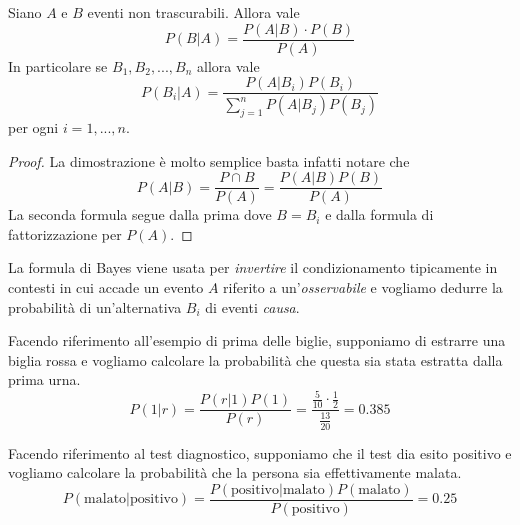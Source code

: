 \begin{theorem}[Bayes]\label{th: bayes}
	Siano $A$ e $B$ eventi non trascurabili. Allora vale
	\[ P(B | A) = \frac{P(A | B) \cdot P(B)}{P(A)} \]
	In particolare se $B_1, B_2, ..., B_n$ allora vale 
	\[ P(B_i | A) = \frac{P(A | B_i) P(B_i)}{\sum_{j=1}^n P(A | B_j) P(B_j)} \]
	per ogni $i = 1, ..., n$.
	\begin{proof}
		La dimostrazione è molto semplice basta infatti notare che 
		\[ P(A | B) = \frac{P \cap B}{P(A)} = \frac{P(A | B) P(B)}{P(A)} \]
		La seconda formula segue dalla prima dove $B=B_i$ e dalla formula di fattorizzazione
		per $P(A)$.
	\end{proof}
\end{theorem}

La formula di Bayes viene usata per \emph{invertire} il condizionamento tipicamente in contesti
in cui accade un evento $A$ riferito a un'\emph{osservabile} e vogliamo dedurre la probabilità di
un'alternativa $B_i$ di eventi \emph{causa}.

\begin{example}
	Facendo riferimento all'esempio di prima delle biglie, supponiamo di estrarre una biglia
	rossa e vogliamo calcolare la probabilità che questa sia stata estratta dalla prima urna.
	\[
		P(1 | r) = \frac{P(r | 1) P(1)}{P(r)} = 
		\frac{\frac{5}{10} \cdot \frac{1}{2}}{\frac{13}{20}} = 0.385
	\]
\end{example}

\begin{example}
	Facendo riferimento al test diagnostico, supponiamo che il test dia esito positivo e vogliamo
	calcolare la probabilità che la persona sia effettivamente malata.
	\[
		P(\text{malato} | \text{positivo}) = 
		\frac{P(\text{positivo} | \text{malato}) P(\text{malato})}{P(\text{positivo})} = 0.25
	\]
\end{example}
